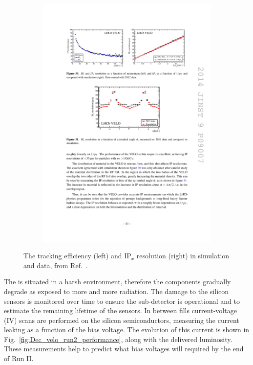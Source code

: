 \begin{figure}[!h]
\begin{subfigure}[t]{0.4\textwidth}
        \includegraphics[width=1.0\textwidth]{figs/Detector/velo_ipx_resolution.pdf}
    \end{subfigure}
    \caption{The tracking efficiency (left) and $\text{IP}_{x}$ resolution (right) in simulation and data, from Ref.~\cite{LHCb-DP-2014-001}.}
    \label{fig:Dec_velo_track_performance}   
\end{figure}

The \velo is situated in a harsh environment, therefore the components gradually degrade as exposed to more and more radiation. The damage to the silicon sensors is monitored over time to ensure the sub-detector is operational and to estimate the remaining lifetime of the sensors. In between \lhc fills current-voltage (IV) scans are performed on the silicon semiconductors, measuring the current leaking as a function of the bias voltage. The evolution of this current is shown in Fig.~\ref{fig:Dec_velo_run2_performance}, along with the delivered luminosity. These measurements help to predict what bias voltages will required by the end of Run II. 

